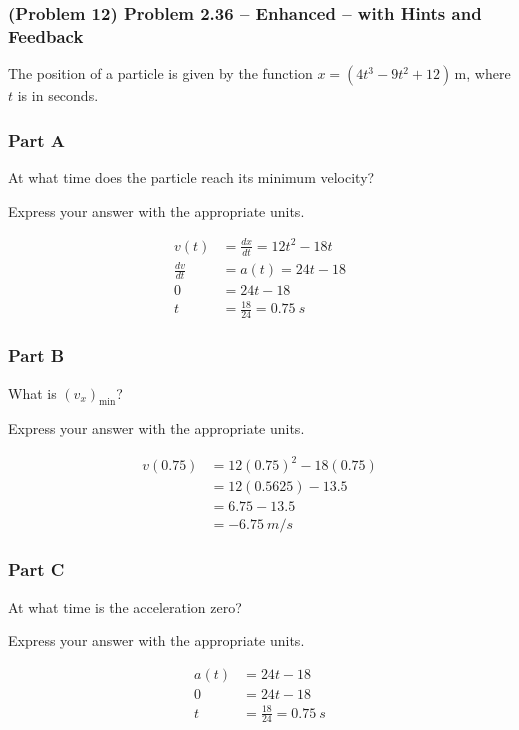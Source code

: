 \newpage

\subsubsection{(Problem 12) Problem 2.36 -- Enhanced -- with Hints and Feedback}

The position of a particle is given by the function $x = (4t^3 - 9t^2 + 12) \, \mathrm{m}$, where \( t \) is in seconds.

\subsubsection{Part A}
At what time does the particle reach its minimum velocity?

Express your answer with the appropriate units.

\begin{solution}
	\begin{align*}
		v(t) &= \frac{dx}{dt} = 12t^2 - 18t \\
		\frac{dv}{dt} &= a(t) = 24t - 18 \\
		0 &= 24t - 18 \\
		t &= \frac{18}{24} = \SI{0.75}{s}
	\end{align*}
\end{solution}

\subsubsection{Part B}
What is \( (v_x)_{\mathrm{min}} \)?

Express your answer with the appropriate units.

\begin{solution}
	\begin{align*}
		v(0.75) &= 12(0.75)^2 - 18(0.75) \\
		&= 12(0.5625) - 13.5 \\
		&= 6.75 - 13.5 \\
		&= \SI{-6.75}{m/s}
	\end{align*}
\end{solution}

\subsubsection{Part C}
At what time is the acceleration zero?

Express your answer with the appropriate units.

\begin{solution}
	\begin{align*}
		a(t) &= 24t - 18 \\
		0 &= 24t - 18 \\
		t &= \frac{18}{24} = \SI{0.75}{s}
	\end{align*}
\end{solution}

